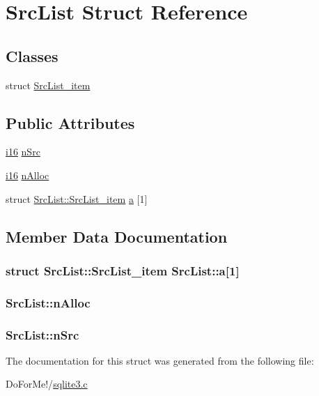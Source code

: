\hypertarget{struct_src_list}{\section{Src\-List Struct Reference}
\label{struct_src_list}
}
\subsection*{Classes}
\begin{DoxyCompactItemize}
\item 
struct \hyperlink{struct_src_list_1_1_src_list__item}{Src\-List\-\_\-item}
\end{DoxyCompactItemize}
\subsection*{Public Attributes}
\begin{DoxyCompactItemize}
\item 
\hyperlink{sqlite3_8c_a7b32340f65cd15f029caad258fb3355c}{i16} \hyperlink{struct_src_list_a99c1d923c49fc0598d92f1cb54958ef4}{n\-Src}
\item 
\hyperlink{sqlite3_8c_a7b32340f65cd15f029caad258fb3355c}{i16} \hyperlink{struct_src_list_aae88b994b131fea8c733aa609bae7e6e}{n\-Alloc}
\item 
struct \hyperlink{struct_src_list_1_1_src_list__item}{Src\-List\-::\-Src\-List\-\_\-item} \hyperlink{struct_src_list_acd181938f7144b40022b28072247aa3d}{a} \mbox{[}1\mbox{]}
\end{DoxyCompactItemize}


\subsection{Member Data Documentation}
\hypertarget{struct_src_list_acd181938f7144b40022b28072247aa3d}{
\subsubsection[{a}]{\setlength{\rightskip}{0pt plus 5cm}struct {\bf Src\-List\-::\-Src\-List\-\_\-item}  Src\-List\-::a\mbox{[}1\mbox{]}}}\label{struct_src_list_acd181938f7144b40022b28072247aa3d}
\hypertarget{struct_src_list_aae88b994b131fea8c733aa609bae7e6e}{
\subsubsection[{n\-Alloc}]{ Src\-List\-::n\-Alloc}}\label{struct_src_list_aae88b994b131fea8c733aa609bae7e6e}
\hypertarget{struct_src_list_a99c1d923c49fc0598d92f1cb54958ef4}{
\subsubsection[{n\-Src}]{ Src\-List\-::n\-Src}}\label{struct_src_list_a99c1d923c49fc0598d92f1cb54958ef4}


The documentation for this struct was generated from the following file\-:\begin{DoxyCompactItemize}
\item 
Do\-For\-Me!/\hyperlink{sqlite3_8c}{sqlite3.\-c}\end{DoxyCompactItemize}
